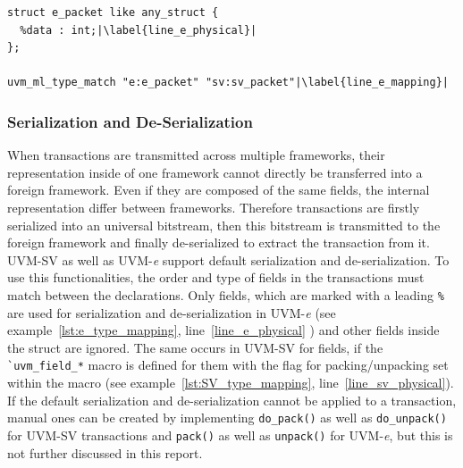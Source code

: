 \lstset{language=e, numbers = left, escapechar=|, breaklines=true}
\begin{lstlisting}[frame=htrbl, caption={\textit{e}: mapping \lstinline$sv_packet$ onto \lstinline$e_packet$},
label={lst:e_type_mapping}]
struct e_packet like any_struct {
  %data : int;|\label{line_e_physical}|
};

uvm_ml_type_match "e:e_packet" "sv:sv_packet"|\label{line_e_mapping}|
\end{lstlisting}

\subsubsection{Serialization and De-Serialization}
When transactions are transmitted across multiple frameworks, their representation inside of one framework cannot
directly be transferred into a foreign framework. Even if they are composed of the same fields, the internal
representation differ between frameworks. Therefore transactions are firstly serialized into an universal bitstream,
then this bitstream is transmitted to the foreign framework and finally de-serialized to extract the transaction from
it.\\
UVM-SV as well as UVM-\textit{e} support default serialization and de-serialization. To use this
functionalities,  the order and type of fields in the transactions must match between the declarations. Only fields,
which are marked with a leading \lstinline$%$ are used for serialization and de-serialization in UVM-\textit{e} (see
example~\ref{lst:e_type_mapping}, line~\ref{line_e_physical} ) and other fields inside the struct are ignored. The same
occurs in UVM-SV for fields, if the \lstinline$`uvm_field_*$ macro is defined for them with the flag for
packing/unpacking set within the macro (see example~\ref{lst:SV_type_mapping}, line~\ref{line_sv_physical}).\\
If the default serialization and de-serialization cannot be applied to a transaction, manual ones can be created by
implementing \lstinline$do_pack()$ as well as \lstinline$do_unpack()$ for UVM-SV transactions and
\lstinline$pack()$ as well as \lstinline$unpack()$ for UVM-\textit{e}, but this is not further discussed in this report. 
